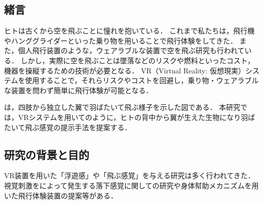 \begin{small}

\section{緒言}

  ヒトは古くから空を飛ぶことに憧れを抱いている．
  これまで私たちは，飛行機やハンググライダーといった乗り物を用いることで飛行体験をしてきた．
  また，個人飛行装置のような，ウェアラブルな装置で空を飛ぶ研究も行われている．
  しかし，実際に空を飛ぶことは墜落などのリスクや燃料といったコスト，機器を操縦するための技術が必要となる．
  VR（Virtual Reality: 仮想現実）システムを使用することで，それらリスクやコストを回避し，乗り物・ウェアラブルな装置を問わず簡単に飛行体験が可能となる．

  は，四肢から独立した翼で羽ばたいて飛ぶ様子を示した図である．
  本研究では，VRシステムを用いてのように，ヒトの背中から翼が生えた生物になり羽ばたいて飛ぶ感覚の提示手法を提案する．
  

  \subsection{研究の背景と目的}
    VR装置を用いた「浮遊感」や「飛ぶ感覚」を与える研究は多く行われてきた．視覚刺激をによって発生する落下感覚に関しての研究\cite{奥川夏輝2017VR空間における視覚刺激によって発生する落下感覚の分析}や身体幇助メカニズムを用いた飛行体験装置の提案\cite{鈴木拓馬2014hmd}等がある．



\end{small}
